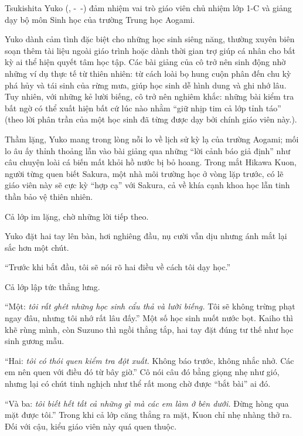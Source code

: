 \documentclass[../main.tex]{subfiles}
\begin{document}
\chrint

Tsukishita Yuko (, -\ -) đảm nhiệm vai trò giáo viên chủ nhiệm lớp 1-C và giảng dạy bộ môn Sinh học của trường Trung học Aogami.

Yuko dành cảm tình đặc biệt cho những học sinh siêng năng, thường xuyên biên soạn thêm tài liệu ngoài giáo trình hoặc dành thời gian trợ giúp cá nhân cho bất kỳ ai thể hiện quyết tâm học tập. Các bài giảng của cô trở nên sinh động nhờ những ví dụ thực tế từ thiên nhiên: từ cách loài bọ hung cuộn phân đến chu kỳ phá hủy và tái sinh của rừng mưa, giúp học sinh dễ hình dung và ghi nhớ lâu. Tuy nhiên, với những kẻ lười biếng, cô trở nên nghiêm khắc: những bài kiểm tra bất ngờ có thể xuất hiện bất cứ lúc nào nhằm ``giữ nhịp tim cả lớp tỉnh táo'' (theo lời phân trần của một học sinh đã từng được dạy bởi chính giáo viên này.).

Thầm lặng, Yuko mang trong lòng nỗi lo về lịch sử kỳ lạ của trường Aogami; mối lo âu ấy thỉnh thoảng lẫn vào bài giảng qua những ``lời cảnh báo giả định'' như câu chuyện loài cá biến mất khỏi hồ nước bị bỏ hoang. Trong mắt Hikawa Kuon, người từng quen biết Sakura, một nhà môi trường học ở vòng lặp trước, có lẽ giáo viên này sẽ cực kỳ ``hợp cạ'' với Sakura, cả về khía cạnh khoa học lẫn tinh thần bảo vệ thiên nhiên.

\chrint

Cả lớp im lặng, chờ những lời tiếp theo.

Yuko đặt hai tay lên bàn, hơi nghiêng đầu, nụ cười vẫn dịu nhưng ánh mắt lại sắc hơn một chút.

``Trước khi bắt đầu, tôi sẽ nói rõ hai điều về cách tôi dạy học.''

Cả lớp lập tức thẳng lưng.

``Một: \emph{tôi rất ghét những học sinh cẩu thả và lười biếng.} Tôi sẽ không trừng phạt ngay đâu, nhưng tôi nhớ rất lâu đấy.'' Một số học sinh nuốt nước bọt. Kaiho thì khẽ rùng mình, còn Suzuno thì ngồi thẳng tắp, hai tay đặt đúng tư thế như học sinh gương mẫu.

``Hai: \emph{tôi có thói quen kiểm tra đột xuất.} Không báo trước, không nhắc nhở. Các em nên quen với điều đó từ bây giờ.'' Cô nói câu đó bằng giọng nhẹ như gió, nhưng lại có chút tinh nghịch như thể rất mong chờ được ``bắt bài'' ai đó.

``Và ba: \emph{tôi biết hết tất cả những gì mà các em làm ở bên dưới.} Đừng hòng qua mặt được tôi.'' Trong khi cả lớp căng thẳng ra mặt, Kuon chỉ nhẹ nhàng thở ra. Đối với cậu, kiểu giáo viên này quá quen thuộc.
\end{document}
